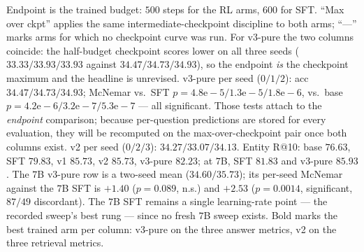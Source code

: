 \begin{table}[t]
\vspace{2pt}
{\footnotesize Endpoint is the trained budget: $500$ steps for the RL arms, $600$ for SFT.
``Max over ckpt'' applies the same intermediate-checkpoint discipline to both arms; ``---'' marks
arms for which no checkpoint curve was run. For v3-pure the two columns coincide: the
half-budget checkpoint scores lower on all three seeds ($33.33/33.93/33.93$ against
$34.47/34.73/34.93$), so the endpoint \emph{is} the checkpoint maximum and the headline is
unrevised. v3-pure per seed ($0/1/2$): acc $34.47 / 34.73 / 34.93$; McNemar vs.\ SFT
$p = 4.8\mathrm{e}{-}5 / 1.3\mathrm{e}{-}5 / 1.8\mathrm{e}{-}6$, vs.\ base
$p = 4.2\mathrm{e}{-}6 / 3.2\mathrm{e}{-}7 / 5.3\mathrm{e}{-}7$ --- all significant. Those tests
attach to the \emph{endpoint} comparison; because per-question predictions are stored for every
evaluation, they will be recomputed on the max-over-checkpoint pair once both columns exist.
v2 per seed ($0/2/3$): $34.27 / 33.07 / 34.13$. Entity R@10: base $76.63$, SFT $79.83$,
v1 $85.73$, v2 $85.73$, v3-pure $82.23$; at $7$B, SFT $81.83$ and v3-pure $85.93$. The $7$B v3-pure row is a
two-seed mean ($34.60 / 35.73$); its per-seed McNemar against the $7$B SFT is $+1.40$
($p{=}0.089$, n.s.) and $+2.53$ ($p{=}0.0014$, significant, $87/49$ discordant). The $7$B SFT
remains a single learning-rate point --- the recorded sweep's best rung --- since no fresh $7$B
sweep exists. Bold marks the best trained arm per column: v3-pure on
the three answer metrics, v2 on the three retrieval metrics.}
\end{table}

